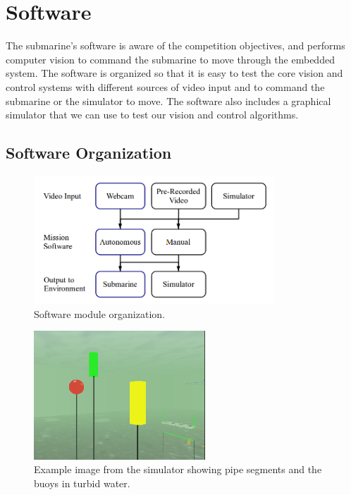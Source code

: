 \section{Software}

The submarine's software is aware of the competition objectives, and performs computer vision to
command the submarine to move through the embedded system.
The software is organized so that it is easy to test the core vision and control systems with different
sources of video input and to command the submarine or the simulator to move.
The software also includes a graphical simulator that we can use to test our vision and control algorithms.

\subsection{Software Organization}
\label{gui}


\begin{figure}
\begin{center}
 \includegraphics[height=1.9in]{fig/modules.png}
\caption{Software module organization.}\label{modules}
\end{center}
\end{figure}


\begin{figure}
\begin{center}
 \includegraphics[height=1.9in]{fig/sim.png}
\caption{Example image from the simulator showing pipe segments and the buoys
         in turbid water.}\label{sim}
\end{center}
\end{figure}

